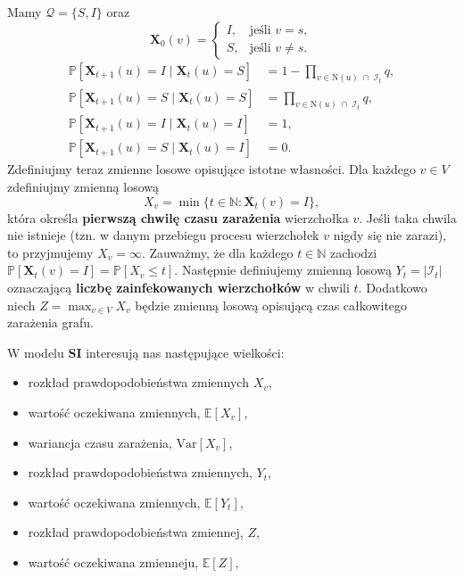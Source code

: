 Mamy $\mathcal{Q} = \{S, I\}$ oraz
\[
\mathbf{X}_0(v) =
\begin{cases}
I, & \text{jeśli } v = s, \\[4pt]
S, & \text{jeśli } v \neq s.
\end{cases}
\]
\[
\begin{aligned}
\mathbb{P}[\mathbf{X}_{t+1}(u) = I \mid \mathbf{X}_t(u) = S]
 &= 1 - \prod_{v \in \mathrm{N}(u) \;\cap\; \mathcal{I}_t} q, \\[6pt]
\mathbb{P}[\mathbf{X}_{t+1}(u) = S \mid \mathbf{X}_t(u) = S]
 &= \prod_{v \in \mathrm{N}(u) \;\cap\; \mathcal{I}_t} q, \\[6pt]
\mathbb{P}[\mathbf{X}_{t+1}(u) = I \mid \mathbf{X}_t(u) = I]
 &= 1, \\[6pt]
\mathbb{P}[\mathbf{X}_{t+1}(u) = S \mid \mathbf{X}_t(u) = I]
 &= 0.
\end{aligned}
\]
Zdefiniujmy teraz zmienne losowe opisujące istotne własności.
Dla każdego $v \in V$ zdefiniujmy zmienną losową
\[
X_v = \min \{ t \in \mathbb{N} : \mathbf{X}_t(v) = I \},
\]
która określa \textbf{pierwszą chwilę czasu zarażenia} wierzchołka $v$.
Jeśli taka chwila nie istnieje (tzn. w danym przebiegu procesu wierzchołek $v$ nigdy się nie zarazi),
to przyjmujemy $X_v = \infty$.
Zauważmy, że dla każdego $t \in \mathbb{N}$ zachodzi $ \mathbb{P}[\mathbf{X}_t(v) = I] = \mathbb{P}[X_v \le t] $. 
Następnie definiujemy zmienną losową $Y_t = |\mathcal{I}_t|$ oznaczającą \textbf{liczbę zainfekowanych wierzchołków} w chwili $t$. Dodatkowo niech $Z = \max_{v \in V} X_v$ będzie zmienną losową opisującą czas całkowitego zarażenia grafu.

W modelu \textbf{SI} interesują nas następujące wielkości:
\begin{itemize}
    \item rozkład prawdopodobieństwa zmiennych $X_v$,
    \item wartość oczekiwana zmiennych, $\mathbb{E}[X_v]$,
    \item wariancja czasu zarażenia, $\mathrm{Var}[X_v]$,
    \item rozkład prawdopodobieństwa zmiennych, $Y_t$,
    \item wartość oczekiwana zmiennych, $\mathbb{E}[Y_t]$,
    \item rozkład prawdopodobieństwa zmiennej, $Z$,
    \item wartość oczekiwana zmienneju, $\mathbb{E}[Z]$,
\end{itemize}



